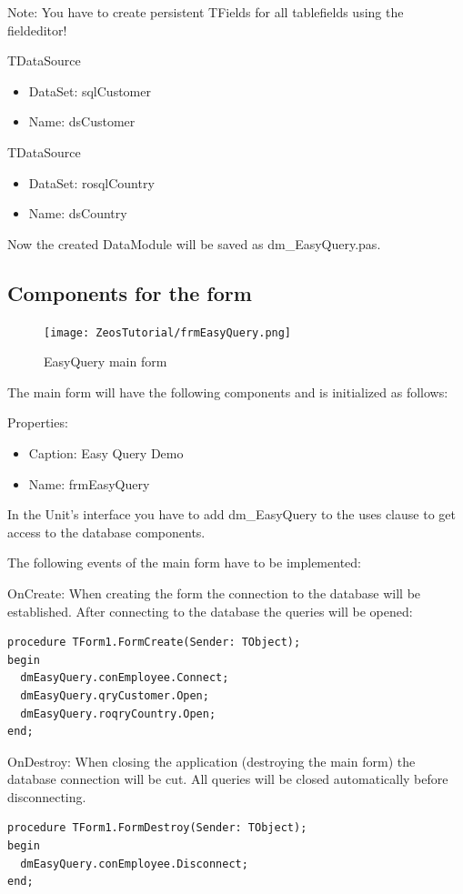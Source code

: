 \documentclass[a4paper,12pt,oneside]{book}
\begin{document}
Note: You have to create persistent TFields for all tablefields using the fieldeditor!

TDataSource
\begin{itemize}
  \item DataSet: sqlCustomer
  \item Name: dsCustomer
\end{itemize}

TDataSource
\begin{itemize}
  \item DataSet: rosqlCountry
	\item Name: dsCountry
\end{itemize}

Now the created DataModule will be saved as dm\_EasyQuery.pas.

\subsection{Components for the form}
\begin{figure}[htbp] 
  \centering
  \texttt{[image: ZeosTutorial/frmEasyQuery.png]}
  \caption{EasyQuery main form}
  \label{fig:frmEasyQuery}
\end{figure}

The main form will have the following components and is initialized as follows:

Properties:
\begin{itemize}
  \item Caption: Easy Query Demo
  \item Name: frmEasyQuery
\end{itemize}

In the Unit's interface you have to add dm\_EasyQuery to the uses clause to get access to the database components.

The following events of the main form have to be implemented:

OnCreate:
When creating the form the connection to the database will be established.
After connecting to the database the queries will be opened:
\begin{verbatim}
procedure TForm1.FormCreate(Sender: TObject);
begin
  dmEasyQuery.conEmployee.Connect;
  dmEasyQuery.qryCustomer.Open;
  dmEasyQuery.roqryCountry.Open;
end;
\end{verbatim}

OnDestroy:
When closing the application (destroying the main form) the database connection will be cut.
All queries will be closed automatically before disconnecting.
\begin{verbatim}
procedure TForm1.FormDestroy(Sender: TObject);
begin
  dmEasyQuery.conEmployee.Disconnect;
end;
\end{verbatim}
\end{document}
